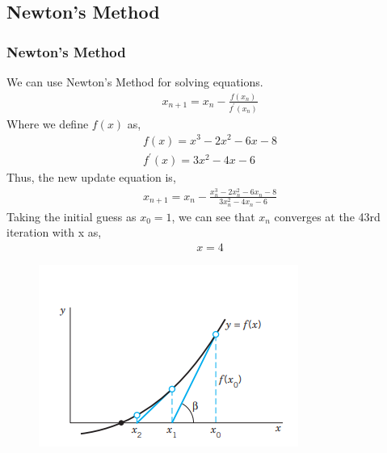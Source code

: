 \documentclass{beamer}
\providecommand{\brak}[1]{\ensuremath{\left(#1\right)}}
\theoremstyle{remark}
\numberwithin{equation}{section}
\begin{document}
\subsection{Newton's Method}
\begin{frame}
	\frametitle{Newton's Method}
	We can use Newton's Method for solving equations.
	\begin{align}
		x_{n+1} = x_n - \frac{f\brak{x_n}}{f^{\prime}\brak{x_n}} 
	\end{align}
	Where we define $f\brak{x}$ as, 
	\begin{align}
		f\brak{x} = x^3 -2x^2 - 6x - 8 \\
		f^{\prime}\brak{x} = 3x^2 -4x - 6 
	\end{align}
	Thus, the new update equation is, 
	\begin{align}
		x_{n+1} = x_n - \frac{x_n^3 -2x_n^2 - 6x_n - 8}{3x_n^2 -4x_n - 6 } 
	\end{align}
	Taking the initial guess as $x_0 = 1$, we can see that $x_n$ converges at the 43rd iteration with x as,
	\begin{align}
		x = 4
	\end{align}
\end{frame}
\begin{frame}
	\begin{figure}[h]
		\centering
		\includegraphics[width=0.6\linewidth]{figs/newton.png}
		\caption{}
	\end{figure}
\end{frame}
\end{document}
